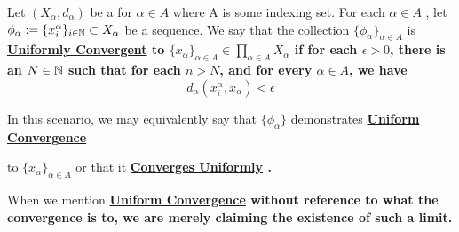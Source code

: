 \label{def:uniformlyconvergent}
\newcommand{\UniformlyConvergent}[0]{
    \bf \hyperref[def:uniformlyconvergent]{Uniformly Convergent} \rm
}
\newcommand{\ConvergesUniformly}[0]{
    \bf \hyperref[def:uniformlyconvergent]{Converges Uniformly} \rm
}
\newcommand{\UniformConvergence}[0]{
    \bf \hyperref[def:uniformlyconvergent]{Uniform Convergence} \rm
}

\begin{df}
	Let $(X_\alpha, d_\alpha)$ be a \PseudometricSpace
	for $\alpha \in A$ where A is some indexing set. 
	For each $\alpha \in A$
	, let $\phi_\alpha :=\{x_i^\alpha\}_{i \in \mathbb{N}} \subset X_{\alpha}$
	be a sequence. 
	We say that the collection $\{\phi_\alpha\}_{\alpha \in A}$ 
    is \UniformlyConvergent to 
    $\{x_\alpha\}_{\alpha \in A} \in \prod\limits_{\alpha \in A} X_\alpha$
    if for each $\epsilon > 0$, 
    there is an $N \in \mathbb{N}$
    such that for each $n>N$, 
    and for every $\alpha \in A$, 
    we have 
    \begin{equation}
        d_\alpha(x^{\alpha}_i,x_\alpha) < \epsilon
    \end{equation}

    In this scenario, we may equivalently say that
    $\{\phi_\alpha\}$ demonstrates \UniformConvergence
    to $\{x_\alpha\}_{\alpha \in A}$ 
    or that it \ConvergesUniformly. 

    When we mention \UniformConvergence without
    reference to what the convergence is to, 
    we are merely claiming the existence of 
    such a limit. 
\end{df}
